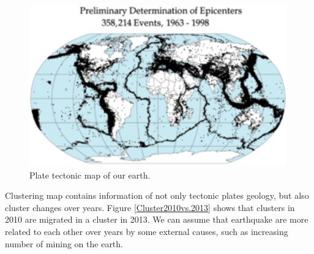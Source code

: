 \documentclass{article}
\begin{document}
\begin{figure}
\includegraphics[width=0.99\textwidth]{../earthquakedata/output_map_plot/Tectonic_plates_boundaries.png}
\caption{Plate tectonic map of our earth.}
\label{PlateWorldMap}
\end{figure}

Clustering map contains information of not only tectonic plates geology, but also cluster changes over years. 
Figure \ref{Cluster2010vs.2013} shows that clusters in 2010 are migrated in a cluster in 2013. We can assume that earthquake are more related to each other over years by some external causes, such as increasing number of mining on the earth.
\end{document}
